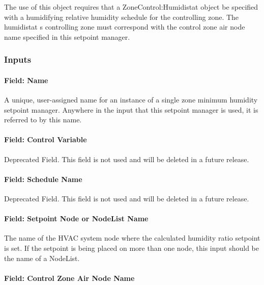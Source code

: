 The use of this object requires that a ZoneControl:Humidistat object be specified with a humidifying relative humidity schedule for the controlling zone. The humidistat s controlling zone must correspond with the control zone air node name specified in this setpoint manager.

\subsubsection{Inputs}\label{inputs-6-024}

\paragraph{Field: Name}\label{field-name-6-020}

A unique, user-assigned name for an instance of a single zone minimum humidity setpoint manager. Anywhere in the input that this setpoint manager is used, it is referred to by this name.

\paragraph{Field: Control Variable}\label{field-control-variable-6}

Deprecated Field. This field is not used and will be deleted in a future release.

\paragraph{Field: Schedule Name}\label{field-schedule-name-2-002}

Deprecated Field. This field is not used and will be deleted in a future release.

\paragraph{Field: Setpoint Node or NodeList Name}\label{field-setpoint-node-or-nodelist-name-6}

The name of the HVAC system node where the calculated humidity ratio setpoint is set. If the setpoint is being placed on more than one node, this input should be the name of a NodeList.

\paragraph{Field: Control Zone Air Node Name}\label{field-control-zone-air-node-name}

